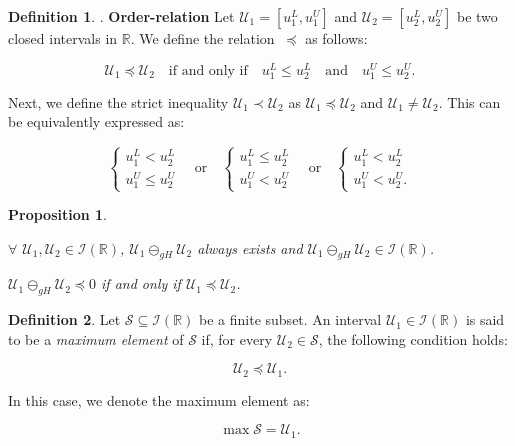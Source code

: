 \documentclass[12pt, reqno]{amsart}
\newtheorem{proposition}{Proposition}[section]
\theoremstyle{definition}
\newtheorem{definition}{Definition}[section]
\theoremstyle{remark}
\numberwithin{equation}{section}
\begin{document}
\begin{definition} \cite{Wu2007}. \textbf{Order-relation} 
Let \( \mathcal{U}_1 = [u_1^L, u_1^U] \) and \( \mathcal{U}_2 = [u_2^L, u_2^U] \) be two closed intervals in \( \mathbb{R} \). We define the relation \( \ \preceq\) as follows:

\begin{equation*}
    \mathcal{U}_1 \preceq\mathcal{ U}_2 \quad \text{if and only if} \quad u_1^L \leq u_2^L \quad \text{and} \quad u_1^U \leq u_2^U.
\end{equation*}

Next, we define the strict inequality \(\mathcal{ U}_1 \prec\mathcal{ U}_2 \) as \(\mathcal{ U}_1 \preceq \mathcal{U}_2 \) and \( \mathcal{U}_1 \neq \mathcal{U}_2 \). This can be equivalently expressed as:

 \[
\begin{cases}
u_{1}^L < u_{2}^L \\
u_{1}^U \leq u_{2}^U
\end{cases}
\quad \text{or} \quad
\begin{cases}
u_{1}^L \leq u_{2}^L \\
u_{1}^U < u_{2}^U
\end{cases}
\quad \text{or} \quad
\begin{cases}
u_{1}^L < u_{2}^L \\
u_{1}^U < u_{2}^U.
\end{cases}
\]
\end{definition} 
\begin{proposition} \cite{Stefanini2009}
        \item[(i)] $\forall$ \( \mathcal{ U}_1, \mathcal{ U}_2 \in \mathcal{I}(\mathbb{R}) \), \( \mathcal{ U}_1 \ominus_{gH} \mathcal{ U}_2 \) always exists and \( \mathcal{ U}_1 \ominus_{gH} \mathcal{ U}_2 \in \mathcal{I}(\mathbb{R}) \).
        \item[(ii)] \( \mathcal{ U}_1 \ominus_{gH} \mathcal{ U}_2 \preceq 0 \) if and only if \( \mathcal{ U}_1 \preceq \mathcal{ U}_2 \).
\end{proposition}

\begin{definition}Let \( \mathcal{S} \subseteq \mathcal{I}(\mathbb{R}) \) be a finite subset. 
An interval \( \mathcal{U}_1 \in \mathcal{I}(\mathbb{R}) \) is said to be a \emph{maximum element} of \( \mathcal{S} \) if, for every \( \mathcal{U}_2 \in \mathcal{S} \), the following condition holds:


\[
\mathcal{U}_2 \preceq \mathcal{U}_1.
\]

In this case, we denote the maximum element as:

\[
\max \mathcal{S} = \mathcal{U}_1.
\]
\end{definition}
\end{document}
